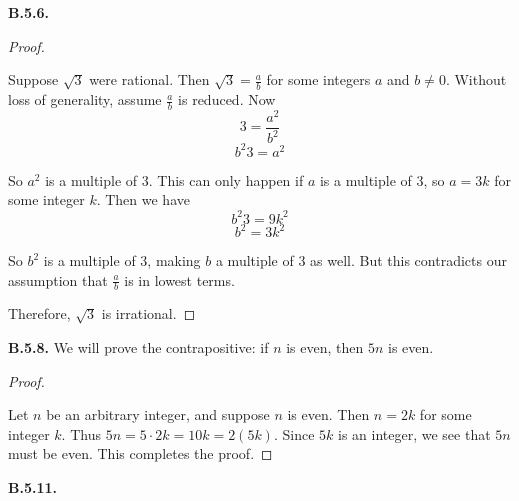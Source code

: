 \documentclass[10pt,]{book}
\theoremstyle{plain}
\theoremstyle{definition}
\theoremstyle{definition}
\theoremstyle{definition}
\theoremstyle{definition}
\numberwithin{equation}{chapter}
\begin{document}
\noindent\textbf{B.5.6.} \begin{proof}\hypertarget{proof-32}{}
\hypertarget{p-2041}{}%
Suppose \(\sqrt{3}\) were rational. Then \(\sqrt{3} = \frac{a}{b}\) for some integers \(a\) and \(b \ne 0\). Without loss of generality, assume \(\frac{a}{b}\) is reduced. Now%
\begin{equation*}
3 = \frac{a^2}{b^2}
\end{equation*}
%
\begin{equation*}
b^2 3 = a^2
\end{equation*}
%
\par
\hypertarget{p-2042}{}%
So \(a^2\) is a multiple of 3. This can only happen if \(a\) is a multiple of 3, so \(a = 3k\) for some integer \(k\). Then we have%
\begin{equation*}
b^2 3 = 9k^2
\end{equation*}
%
\begin{equation*}
b^2 = 3k^2
\end{equation*}
%
\par
\hypertarget{p-2043}{}%
So \(b^2\) is a multiple of 3, making \(b\) a multiple of 3 as well. But this contradicts our assumption that \(\frac{a}{b}\) is in lowest terms.%
\par
\hypertarget{p-2044}{}%
Therefore, \(\sqrt{3}\) is irrational.%
\end{proof}
\par\smallskip
\noindent\textbf{B.5.8.} \hypertarget{p-2050}{}%
We will prove the contrapositive: if \(n\) is even, then \(5n\) is even.%
\begin{proof}\hypertarget{proof-33}{}
\hypertarget{p-2051}{}%
Let \(n\) be an arbitrary integer, and suppose \(n\) is even. Then \(n = 2k\) for some integer \(k\). Thus \(5n = 5\cdot 2k = 10k = 2(5k)\). Since \(5k\) is an integer, we see that \(5n\) must be even. This completes the proof.%
\end{proof}
\par\smallskip
\noindent\textbf{B.5.11.} \hypertarget{p-2056}{}%
\leavevmode%
\end{document}
